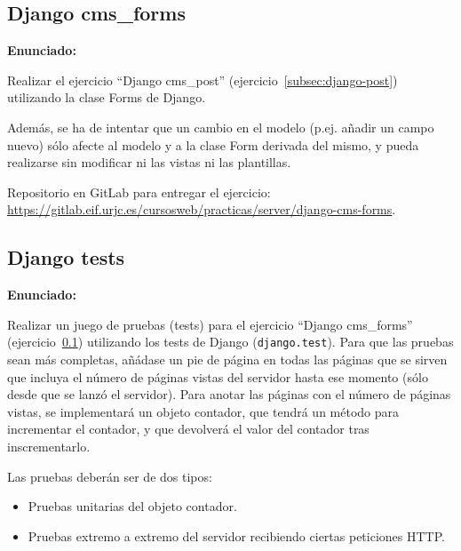 \subsection{Django cms\_forms}
\label{subsec:django-forms}

\textbf{Enunciado:}

Realizar el ejercicio ``Django cms\_post'' (ejercicio~\ref{subsec:django-post}) utilizando la clase Forms de Django. 

Además, se ha de intentar que un cambio en el modelo (p.ej. añadir un campo nuevo) sólo afecte al modelo y a la clase Form derivada del mismo, y pueda realizarse sin modificar ni las vistas ni las plantillas.

Repositorio en GitLab para entregar el ejercicio: \\ 
\url{https://gitlab.eif.urjc.es/cursosweb/practicas/server/django-cms-forms}.


\subsection{Django tests}
\label{subsec:django-tests}

\textbf{Enunciado:}

Realizar un juego de pruebas (tests) para el ejercicio ``Django cms\_forms'' (ejercicio~\ref{subsec:django-forms}) utilizando los tests de Django (\texttt{django.test}). Para que las pruebas sean más completas, añádase un pie de página en todas las páginas que se sirven que incluya el número de páginas vistas del servidor hasta ese momento (sólo desde que se lanzó el servidor). Para anotar las páginas con el número de páginas vistas, se implementará un objeto contador, que tendrá un método para incrementar el contador, y que devolverá el valor del contador tras inscrementarlo.

Las pruebas deberán ser de dos tipos:

\begin{itemize}
\item Pruebas unitarias del objeto contador.
\item Pruebas extremo a extremo del servidor recibiendo ciertas peticiones HTTP.
\end{itemize}

